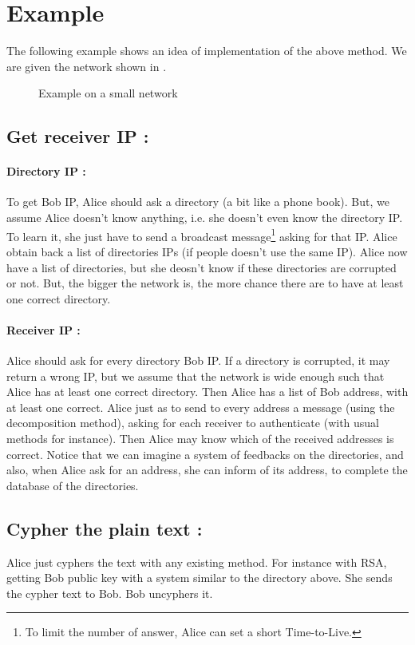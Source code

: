 \documentclass[a4paper, onecolumn, 10pt]{article}
\numberwithin{equation}{section}
\begin{document}
\newpage
\appendix 
\section{Example}
The following example shows an idea of implementation of the above method. We are given the network shown in .
\begin{figure}[h]
  \begin{center}
    
    \caption{Example on a small network}
    \label{fig:example0}
  \end{center}
\end{figure}
\subsection{Get receiver IP :}
\paragraph{Directory IP :}
To get Bob IP, Alice should ask a directory (a bit like a phone book). But, we assume Alice doesn't know anything, i.e. she doesn't even know the directory IP. To learn it, she just have to send a broadcast message\footnote{To limit the number of answer, Alice can set a short Time-to-Live.} asking for that IP. Alice obtain back a list of directories IPs (if people doesn't use the same IP). Alice now have a list of directories, but she deosn't know if these directories are corrupted or not. But, the bigger the network is, the more chance there are to have at least one correct directory. 
\paragraph{Receiver IP :}
Alice should ask for every directory Bob IP. If a directory is corrupted, it may return a wrong IP, but we assume that the network is wide enough such that Alice has at least one correct directory. Then Alice has a list of Bob address, with at least one correct. Alice just as to send to every address a message (using the decomposition method), asking for each receiver to authenticate (with usual methods for instance). Then Alice may know which of the received addresses is correct. Notice that we can imagine a system of feedbacks on the directories, and also, when Alice ask for an address, she can inform of its address, to complete the database of the directories.
\subsection{Cypher the plain text :}
Alice just cyphers the text with any existing method. For instance with RSA, getting Bob public key with a system similar to the directory above. She sends the cypher text to Bob. Bob uncyphers it.
\end{document}
